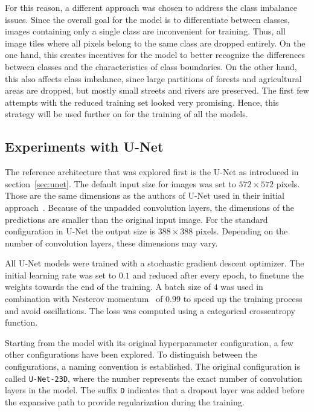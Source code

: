For this reason, a different approach was chosen to address the class imbalance issues. Since the overall goal for the model is to differentiate between classes, images containing only a single class are inconvenient for training. Thus, all image tiles where all pixels belong to the same class are dropped entirely. On the one hand, this creates incentives for the model to better recognize the differences between classes and the characteristics of class boundaries. On the other hand, this also affects class imbalance, since large partitions of forests and agricultural areas are dropped, but mostly small streets and rivers are preserved. The first few attempts with the reduced training set looked very promising. Hence, this strategy will be used further on for the training of all the models.

\subsection{Experiments with U-Net}
\label{sec:unet_experiments}
The reference architecture that was explored first is the U-Net as introduced in section~\ref{sec:unet}. The default input size for images was set to $572\times 572$ pixels. Those are the same dimensions as the authors of U-Net used in their initial approach~\cite{unet15}. Because of the unpadded convolution layers, the dimensions of the predictions are smaller than the original input image. For the standard configuration in U-Net the output size is $388\times 388$ pixels. Depending on the number of convolution layers, these dimensions may vary.

All U-Net models were trained with a stochastic gradient descent optimizer. The initial learning rate was set to $0.1$ and reduced after every epoch, to finetune the weights towards the end of the training. A batch size of $4$ was used in combination with Nesterov momentum~\cite{nesterov83} of $0.99$ to speed up the training process and avoid oscillations. The loss was computed using a categorical crossentropy function.

Starting from the model with its original hyperparameter configuration, a few other configurations have been explored. To distinguish between the configurations, a naming convention is established. The original configuration is called \texttt{U-Net-23D}, where the number represents the exact number of convolution layers in the model. The suffix \texttt{D} indicates that a dropout layer was added before the expansive path to provide regularization during the training.

